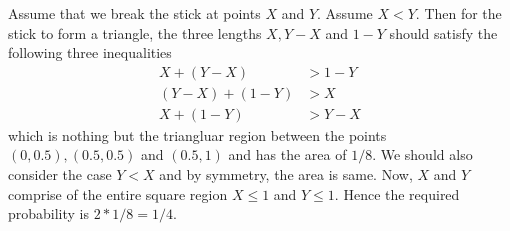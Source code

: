 \documentclass[../../probability-notes.tex]{subfile}
\begin{document}
        Assume that we break the stick at points $X$ and $Y$. Assume $X < Y$. Then for the stick to form a triangle, the three lengths $X, Y-X$ and $1-Y$ should satisfy the following three inequalities
        \begin{align*}
            X+(Y-X) &> 1-Y\\
            (Y-X) + (1-Y) &> X\\
            X + (1-Y) &> Y-X
        \end{align*}
        which is nothing but the triangluar region between the points $(0, 0.5), (0.5, 0.5)$ and $(0.5, 1)$ and has the area of $1/8$. We should also consider the case $Y < X$ and by symmetry, the area is same. Now, $X$ and $Y$ comprise of the entire square region $X \leq 1$ and $Y \leq 1$. Hence the required probability is $2 * 1/8 = 1/4$.
\end{document}
